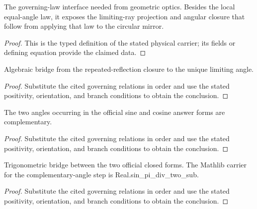\begin{definition}
  \label{def:physics:IPhO_2026_2_A_1:aux012}
  The governing-law interface needed from geometric optics. Besides the local equal-angle law, it exposes the limiting-ray projection and angular closure that follow from applying that law to the circular mirror.
\end{definition}
\begin{proof}
  This is the typed definition of the stated physical carrier; its fields or defining equation provide the claimed data.
\end{proof}

\begin{lemma}
  \label{lem:physics:IPhO_2026_2_A_1:aux013}
  Algebraic bridge from the repeated-reflection closure to the unique limiting angle.
\end{lemma}
\begin{proof}
  Substitute the cited governing relations in order and use the stated positivity, orientation, and branch conditions to obtain the conclusion.
\end{proof}

\begin{lemma}
  \label{lem:physics:IPhO_2026_2_A_1:aux014}
  The two angles occurring in the official sine and cosine answer forms are complementary.
\end{lemma}
\begin{proof}
  Substitute the cited governing relations in order and use the stated positivity, orientation, and branch conditions to obtain the conclusion.
\end{proof}

\begin{lemma}
  \label{lem:physics:IPhO_2026_2_A_1:aux015}
  Trigonometric bridge between the two official closed forms. The Mathlib carrier for the complementary-angle step is Real.sin\_pi\_div\_two\_sub.
\end{lemma}
\begin{proof}
  Substitute the cited governing relations in order and use the stated positivity, orientation, and branch conditions to obtain the conclusion.
\end{proof}
